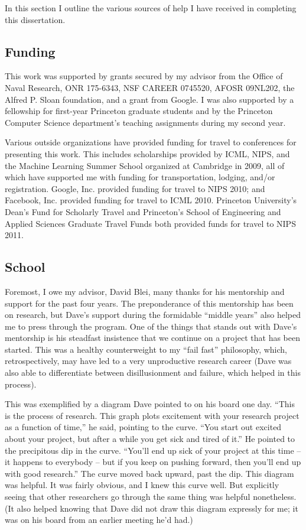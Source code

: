 In this section I outline the various sources of help I have received
in completing this dissertation.

\subsection*{Funding}
This work was supported by grants secured by my advisor from the
Office of Naval Research, ONR 175-6343, NSF CAREER 0745520, AFOSR
09NL202, the Alfred P. Sloan foundation, and a grant from Google.  I
was also supported by a fellowship for first-year Princeton graduate
students and by the Princeton Computer Science department's teaching
assignments during my second year.

Various outside organizations have provided funding for travel to
conferences for presenting this work.  This includes scholarships
provided by ICML, NIPS, and the Machine Learning Summer School
organized at Cambridge in 2009, all of which have supported me with
funding for transportation, lodging, and/or registration.  Google,
Inc. provided funding for travel to NIPS 2010; and Facebook,
Inc. provided funding for travel to ICML 2010.  Princeton University's
Dean's Fund for Scholarly Travel and Princeton's School of Engineering
and Applied Sciences Graduate Travel Funds both provided funds for
travel to NIPS 2011.

\subsection*{School}
Foremost, I owe my advisor, David Blei, many thanks for his mentorship
and support for the past four years.  The preponderance of this
mentorship has been on research, but Dave's support during the
formidable ``middle years'' also helped me to press through the
program.  One of the things that stands out with Dave's mentorship is
his steadfast insistence that we continue on a project that has been
started.  This was a healthy counterweight to my ``fail fast''
philosophy, which, retrospectively, may have led to a very
unproductive research career (Dave was also able to differentiate
between disillusionment and failure, which helped in this process).

This was exemplified by a diagram Dave pointed to on his board one
day.  ``This is the process of research.  This graph plots excitement
with your research project as a function of time,'' he said, pointing
to the curve.  ``You start out excited about your project, but after a
while you get sick and tired of it.''  He pointed to the precipitous
dip in the curve.  ``You'll end up sick of your project at this time
-- it happens to everybody -- but if you keep on pushing forward, then
you'll end up with good research.''  The curve moved back upward, past
the dip.  This diagram was helpful.  It was fairly obvious, and I knew
this curve well.  But explicitly seeing that other researchers go
through the same thing was helpful nonetheless.  (It also helped
knowing that Dave did not draw this diagram expressly for me; it was
on his board from an earlier meeting he'd had.)

